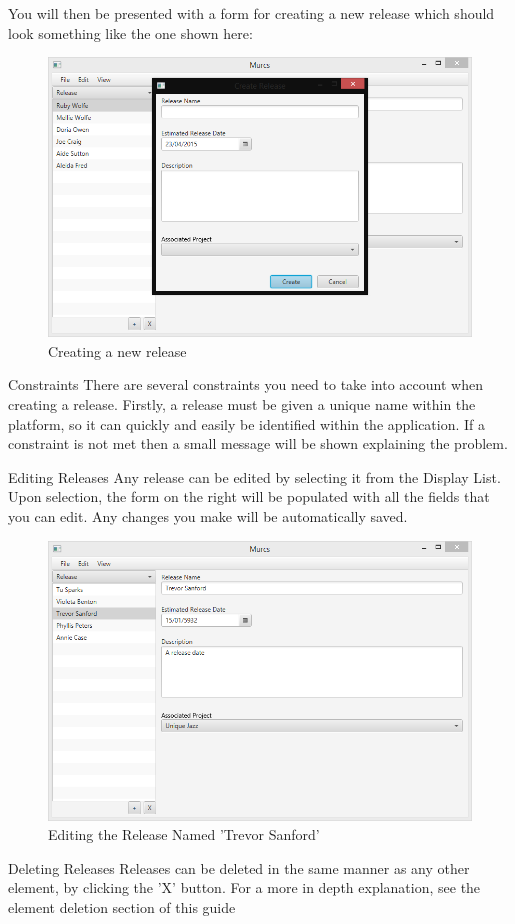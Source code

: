 You will then be presented with a form for creating a new release which should look something like the one shown here:

\begin{figure}[H]
\centering
\includegraphics[width=\textwidth]{images/screenshots/releases3.PNG}
\caption{Creating a new release}
\label{fig:new_project}
\end{figure}

Constraints
\newline
There are several constraints you need to take into account when creating a release. Firstly, a release must be given a unique name within the platform, so it can quickly and easily be identified within the application. If a constraint is not met then a small message will be shown explaining the problem.

Editing Releases
\newline
Any release can be edited by selecting it from the Display List. Upon selection, the form on the right will be populated with all the fields that you can edit. Any changes you make will be automatically saved.

\begin{figure}[H]
\centering
\includegraphics[width=\textwidth]{images/screenshots/releases4.PNG}
\caption{Editing the Release Named 'Trevor Sanford'}
\label{fig:new_project}
\end{figure}

Deleting Releases
\newline
Releases can be deleted in the same manner as any other element, by clicking the 'X' button. For a more in depth explanation, see the element deletion section of this guide

